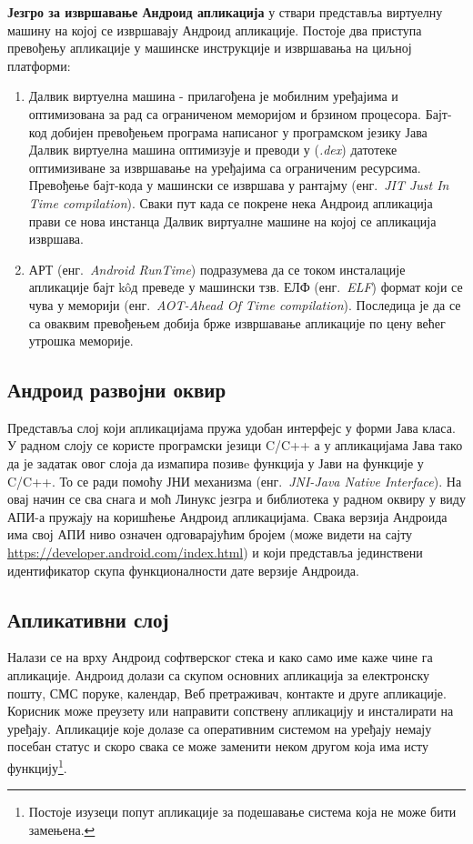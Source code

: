 \documentclass[12pt,oneside]{memoir}
\theoremstyle{remark}
\begin{document}
\textbf{Језгро за извршавање Андроид апликација} у ствари представља виртуелну машину на којој се извршавају Андроид апликације. Постоје два приступа превођењу апликације у машинске инструкције и извршавања на циљној платформи:
\begin{enumerate}
\item Далвик виртуелна машина - прилагођена је мобилним уређајима и оптимизована за рад са ограниченом меморијом и брзином процесора. Бајт-код добијен превођењем програма написаног у програмском језику Јава Далвик виртуелна машина оптимизује и преводи у  ({\em *.dex}) датотеке оптимизиване за извршавање на уређајима са ограниченим ресурсима. Превођење бајт-кода у машински се извршава у рантајму  (енг.~{\em JIT Just In Time compilation}). Сваки пут када се покрене нека Андроид апликација прави се нова инстанца Далвик виртуалне машине на којој се апликација извршава.
\item АРТ  (енг.~{\em Android RunTime}) подразумева да се током инсталације апликације бајт k\^{o}д преведе у машински тзв. ЕЛФ  (енг.~{\em ELF}) формат који се чува у меморији  (енг.~{\em AOT-Ahead Of Time compilation}). Последица је да се са оваквим превођењем добија брже извршавање апликације по цену већег утрошка меморије.
\end{enumerate}

\subsection{Андроид развојни оквир}
Представља слој који апликацијама пружа удобан интерфејс у форми Јава класа. У радном слоју се користе програмски језици C/C++ а у апликацијама Јава тако да је задатак овог слоја да измапира позивe функција у Јави на функције у C/C++. То се ради помоћу ЈНИ механизма (енг.~{\em JNI-Java Native Interface}). На овај начин се сва снага и моћ Линукс језгра и библиотека у радном оквиру у виду АПИ-а пружају на коришћење Андроид апликацијама. Свака верзија Андроида има свој АПИ ниво означен одговарајућим бројем (може видети на сајту \url{https://developer.android.com/index.html}) и који представља јединствени идентификатор скупа функционалности дате верзије Андроида.

\subsection{Апликативни слој}
Налази се на врху Андроид софтверског стека и како само име каже чине га апликације. Андроид долази са скупом основних апликација за електронску пошту, СМС поруке, календар, Веб претраживач, контакте и друге апликације. Корисник може преузету или направити сопствену апликацију и инсталирати на уређају. Апликације које долазе са оперативним системом на уређају немају посебан статус и скоро свака се може заменити неком другом која има исту функцију\footnote{Постоје изузеци попут апликације за подешавање система која не може бити замењена.}.
\end{document}
